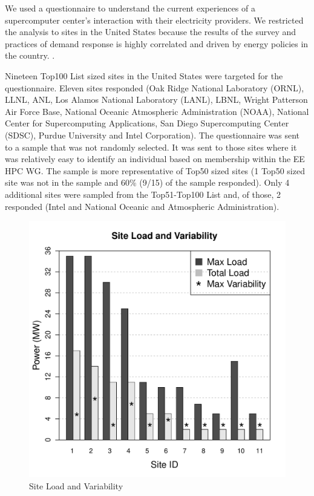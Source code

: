 We used a questionnaire to understand the current experiences of a
supercomputer center's interaction with their electricity providers. We restricted the analysis to sites in the United States
because the results of the survey and practices of demand response is highly
correlated and driven by energy policies in the country. 
\cite{torriti_demand_2010}.

Nineteen Top100 List sized sites in the United States were targeted for the
questionnaire. Eleven sites responded (Oak Ridge National Laboratory (ORNL), 
LLNL, 
ANL, 
Los Alamos National Laboratory (LANL), LBNL, 
Wright Patterson Air Force Base,
National Oceanic Atmospheric Administration (NOAA), 
National Center for Supercomputing Applications, 
San Diego Supercomputing Center (SDSC), 
Purdue University and Intel Corporation). The questionnaire was
sent to a sample that was not randomly selected. It was sent to those sites
where it was relatively easy to identify an individual based on membership
within the EE HPC WG. The sample is more representative of Top50 sized sites
(1 Top50 sized site was not in the sample and 60{\%} (9/15) of the sample
responded). Only 4 additional sites were sampled from the Top51-Top100 List
and, of those, 2 responded (Intel and National Oceanic and Atmospheric Administration).

\begin{figure}[htbp]
\begin{center}
\includegraphics[scale=0.4]{NewGraphs/Table1-graph.pdf}
\caption{Site Load and Variability}
\label{figGraph1}
\end{center}
\end{figure}

